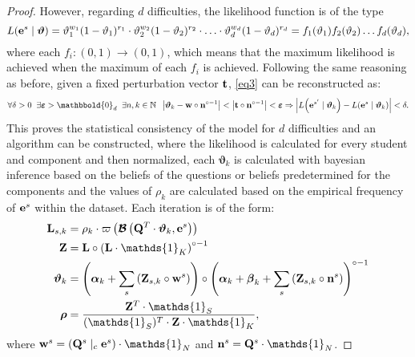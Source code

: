\documentclass{article}
\newcommand{\0}{\mathbbold{0}}
\newcommand{\1}{\mathds{1}}
\newcommand{\Lh}[2]{L\!\left(#1 \mid #2\right)}
\begin{document}
\begin{proof}
    However, regarding $d$ difficulties, the likelihood function is of the type
    $$ \Lh{{\bf e}^s}{\boldsymbol \vartheta} = \vartheta_1^{w_1}(1-\vartheta_1)^{r_1} \cdot \vartheta_2^{w_2}(1-\vartheta_2)^{r_2} \cdot \hdots \cdot \vartheta_d^{w_d}(1-\vartheta_d)^{r_d} = f_1(\vartheta_1)f_2(\vartheta_2)\dots f_d(\vartheta_d), $$
    where each $f_i: (0,1) \rightarrow (0,1)$, which means that the maximum likelihood is achieved when the maximum of each $f_i$ is achieved.
    Following the same reasoning as before, given a fixed perturbation vector ${\bf t}$, \eqref{eq3} can be reconstructed as:
    \begin{equation}
        \forall \delta > 0 \;\; \exists \boldsymbol{\varepsilon} > \0_d \;\; \exists n,k \in \mathbb{N} \;\; \left| \boldsymbol{\vartheta}_k - {\bf w} \circ {\bf n}^{\circ-1} \right| < \left| {\bf t} \circ {\bf n}^{\circ-1} \right| < \boldsymbol{\varepsilon} \Rightarrow \left| \Lh{{\bf e}^{s'}}{\boldsymbol{\vartheta}_k} - \Lh{{\bf e}^{s}}{\boldsymbol{\vartheta}_k} \right| < \delta. \label{eq4}
    \end{equation}
    This proves the statistical consistency of the model for $d$ difficulties and an algorithm can be constructed, where the likelihood is calculated for every student and component and then normalized, each $\boldsymbol{\vartheta}_k$ is calculated with bayesian inference based on the beliefs of the questions or beliefs predetermined for the components and the values of $\rho_k$ are calculated based on the empirical frequency of ${\bf e}^s$ within the dataset.
    Each iteration is of the form:
    \begin{align}\begin{split}\label{alg1}
        {\bf L}_{s,k} &= \rho_k \cdot \varpi\left(\boldsymbol{\mathcal{B}}\left({\bf Q}^T \cdot \boldsymbol{\vartheta}_k, {\bf e}^s\right)\right) \\
        {\bf Z} &= {\bf L} \circ \left({\bf L} \cdot \1_K\right)^{\circ-1} \\
        \boldsymbol{\vartheta}_k &= \left( \boldsymbol{\alpha}_k + \sum_s \left({\bf Z}_{s,k} \circ {\bf w}^s\right) \right) \circ \left( \boldsymbol{\alpha}_k + \boldsymbol{\beta}_k + \sum_s\left({\bf Z}_{s,k} \circ {\bf n}^s\right) \right)^{\circ-1} \\
        \boldsymbol{\rho} &= \frac{{\bf Z}^T \cdot \1_S}{(\1_S)^T \cdot {\bf Z} \cdot \1_K},
    \end{split}\end{align}
    where ${\bf w}^s = \left({\bf Q}^s \mid_c {\bf e}^s \right) \cdot \1_N$ and ${\bf n}^s = {\bf Q}^s \cdot \1_N$.
\end{proof}
\end{document}
